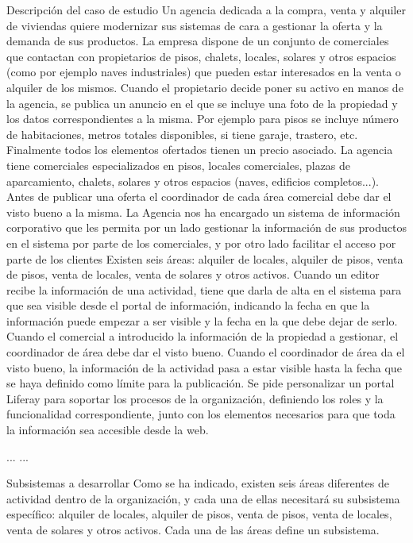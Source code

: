 \begin{minipage}{40em}
  Descripción del caso de estudio
Un agencia dedicada a la compra, venta y alquiler de viviendas quiere modernizar sus
sistemas de cara a gestionar la oferta y la demanda de sus productos.
La empresa dispone de un conjunto de comerciales que contactan con propietarios de
pisos, chalets, locales, solares y otros espacios (como por ejemplo naves industriales)
que pueden estar interesados en la venta o alquiler de los mismos. Cuando el
propietario decide poner su activo en manos de la agencia, se publica un anuncio en el
que se incluye una foto de la propiedad y los datos correspondientes a la misma. Por
ejemplo para pisos se incluye número de habitaciones, metros totales disponibles, si
tiene garaje, trastero, etc. Finalmente todos los elementos ofertados tienen un precio
asociado.
La agencia tiene comerciales especializados en pisos, locales comerciales, plazas de
aparcamiento, chalets, solares y otros espacios (naves, edificios completos...). Antes
de publicar una oferta el coordinador de cada área comercial debe dar el visto bueno a
la misma.
La Agencia nos ha encargado un sistema de información corporativo que les permita
por un lado gestionar la información de sus productos en el sistema por parte de los
comerciales, y por otro lado facilitar el acceso por parte de los clientes
Existen seis áreas: alquiler de locales, alquiler de pisos, venta de pisos, venta de
locales, venta de solares y otros activos. Cuando un editor recibe la información de una
actividad, tiene que darla de alta en el sistema para que sea visible desde el portal de
información, indicando la fecha en que la información puede empezar a ser visible y la
fecha en la que debe dejar de serlo.
Cuando el comercial a introducido la información de la propiedad a gestionar, el
coordinador de área debe dar el visto bueno. Cuando el coordinador de área da el
visto bueno, la información de la actividad pasa a estar visible hasta la fecha que se
haya definido como límite para la publicación.
Se pide personalizar un portal Liferay para soportar los procesos de la organización,
definiendo los roles y la funcionalidad correspondiente, junto con los elementos
necesarios para que toda la información sea accesible desde la web.

...
...

Subsistemas a desarrollar
Como se ha indicado, existen seis áreas diferentes de actividad dentro de la
organización, y cada una de ellas necesitará su subsistema específico: alquiler de
locales, alquiler de pisos, venta de pisos, venta de locales, venta de solares y otros
activos. Cada una de las áreas define un subsistema.

\end{minipage}
